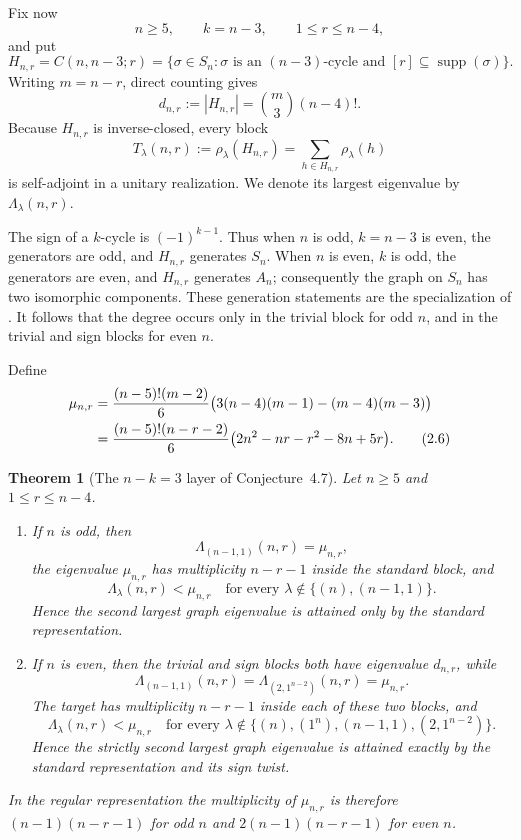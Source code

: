 \documentclass[11pt]{article}
\newtheorem{theorem}{Theorem}[section]
\theoremstyle{definition}
\newcommand{\supp}{\operatorname{supp}}
\begin{document}
Fix now
\[
 n\geq5,\qquad k=n-3,\qquad 1\leq r\leq n-4,
\]
and put
\[
 H_{n,r}=C(n,n-3;r)
 =\{\sigma\in S_n:\sigma\text{ is an $(n-3)$-cycle and }
 [r]\subseteq\supp(\sigma)\}.
\]
Writing $m=n-r$, direct counting gives
\[
 d_{n,r}:=|H_{n,r}|=\binom{m}{3}(n-4)!.
 \tag{2.4}
\]
Because $H_{n,r}$ is inverse-closed, every block
\[
 T_\lambda(n,r):=\rho_\lambda(H_{n,r})
 =\sum_{h\in H_{n,r}}\rho_\lambda(h)
 \tag{2.5}
\]
is self-adjoint in a unitary realization.  We denote its largest eigenvalue
by $\Lambda_\lambda(n,r)$.

The sign of a $k$-cycle is $(-1)^{k-1}$.  Thus when $n$ is odd, $k=n-3$
is even, the generators are odd, and $H_{n,r}$ generates $S_n$.  When $n$
is even, $k$ is odd, the generators are even, and $H_{n,r}$ generates
$A_n$; consequently the graph on $S_n$ has two isomorphic components.
These generation statements are the specialization of
\cite[Lemma~2.14]{LiXiaZhou2026}.  It follows that the degree occurs only in
the trivial block for odd $n$, and in the trivial and sign blocks for even
$n$.

Define
\begin{align}
 \mu_{n,r}
 &=\frac{(n-5)!(m-2)}6
 \bigl(3(n-4)(m-1)-(m-4)(m-3)\bigr) \notag\\
 &=\frac{(n-5)!(n-r-2)}6
 \bigl(2n^2-nr-r^2-8n+5r\bigr).
 \tag{2.6}
\end{align}

\newpage
\begin{theorem}[The $n-k=3$ layer of Conjecture~4.7]\label{thm:main}
Let $n\geq5$ and $1\leq r\leq n-4$.
\begin{enumerate}
\item If $n$ is odd, then
\[
 \Lambda_{(n-1,1)}(n,r)=\mu_{n,r},
\]
the eigenvalue $\mu_{n,r}$ has multiplicity $n-r-1$ inside the standard
block, and
\[
 \Lambda_\lambda(n,r)<\mu_{n,r}
 \quad\text{for every }\lambda\notin\{(n),(n-1,1)\}.
\]
Hence the second largest graph eigenvalue is attained only by the standard
representation.
\item If $n$ is even, then the trivial and sign blocks both have eigenvalue
$d_{n,r}$, while
\[
 \Lambda_{(n-1,1)}(n,r)
 =\Lambda_{(2,1^{n-2})}(n,r)=\mu_{n,r}.
\]
The target has multiplicity $n-r-1$ inside each of these two blocks, and
\[
 \Lambda_\lambda(n,r)<\mu_{n,r}
 \quad\text{for every }
 \lambda\notin\{(n),(1^n),(n-1,1),(2,1^{n-2})\}.
\]
Hence the strictly second largest graph eigenvalue is attained exactly by
the standard representation and its sign twist.
\end{enumerate}
In the regular representation the multiplicity of $\mu_{n,r}$ is therefore
$(n-1)(n-r-1)$ for odd $n$ and $2(n-1)(n-r-1)$ for even $n$.
\end{theorem}
\end{document}
